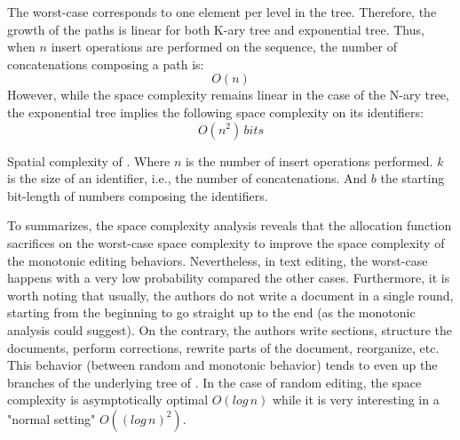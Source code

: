 \begin{asparadesc}
\item [The worst-case] corresponds to one element per level in the
  tree. Therefore, the growth of the paths is linear for both K-ary tree and
  exponential tree. Thus, when $n$ insert operations are performed on the
  sequence, the number of concatenations composing a path is:
  \begin{equation} O(n) \end{equation} However, while the space complexity
  remains linear in the case of the N-ary tree, the exponential tree implies
  the following space complexity on its identifiers:
  \begin{equation} O(n^2) \, bits \end{equation}
\end{asparadesc}

\begin{table*}
  \centering
  
  \caption{\label{table:lseqcomplexities}
    Spatial complexity of \LSEQ. Where $n$ is the number
    of insert operations performed. $k$ is the size of an identifier, i.e.,
    the number of concatenations. And $b$ the starting bit-length of numbers
    composing the identifiers.}
\end{table*}

To summarizes, the space complexity analysis reveals that the allocation
function \LSEQ sacrifices on the worst-case space complexity to improve the
space complexity of the monotonic editing behaviors. Nevertheless, in text
editing, the worst-case happens with a very low probability compared the other
cases. Furthermore, it is worth noting that usually, the authors do not write a
document in a single round, starting from the beginning to go straight up to
the end (as the monotonic analysis could suggest). On the contrary, the authors
write sections, structure the documents, perform corrections, rewrite parts of
the document, reorganize, etc. This behavior (between random and monotonic
behavior) tends to even up the branches of the underlying tree of \LSEQ. In
the case of random editing, the space complexity is asymptotically optimal
$O(log\,n)$ while it is very interesting in a "normal setting" $O((log\,n)^2)$.


